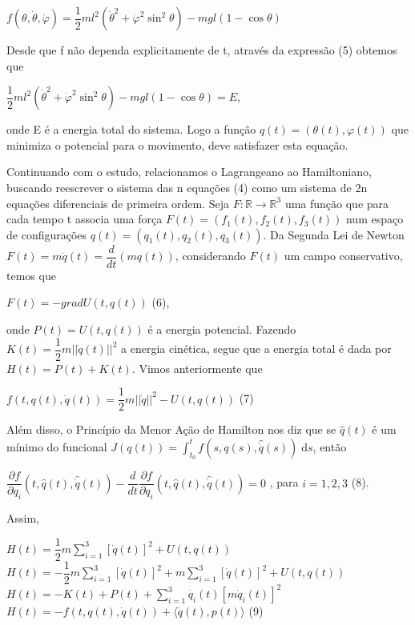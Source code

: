 \documentclass[12pt, a4paper]{article}
\begin{document}
\begin{center}
$ f(\theta, \dot \theta, \dot \varphi) =  \dfrac{1}{2}ml^2({\dot \theta}^2 + {\dot \varphi}^2 \sin^2 \theta) - mgl(1-\cos\theta)$
\end{center}

Desde que f não dependa explicitamente de t, através da expressão (5) obtemos que

\begin{center}
$\dfrac{1}{2}ml^2({\dot \theta}^2 + {\dot \varphi}^2 \sin^2 \theta) - mgl(1-\cos\theta) = E$,
\end{center}

onde E é a energia total do sistema. Logo a função $q(t)=(\theta(t),\varphi(t))$ que minimiza o potencial para o movimento, deve satisfazer esta equação.

Continuando com o estudo, relacionamos o Lagrangeano ao Hamiltoniano, buscando reescrever o sistema das n equações (4) como um sistema de 2n equações diferenciais de primeira ordem.
Seja $F: \mathbb{R} \to \mathbb{R}^3$ uma função que para cada tempo t associa uma força $F(t)=(f_1(t),f_2(t),f_3(t))$ num espaço de configurações $q(t)=(q_1(t),q_2(t),q_3(t))$. Da Segunda Lei de Newton $F(t)=m\ddot q(t)=  \dfrac{d}{dt}(mq(t))$, considerando $F(t)$ um campo conservativo, temos que

\begin{center}
$ F(t) = -grad U(t, q(t)) $ (6),
\end{center}

onde $P(t) = U(t,q(t))$ é a energia potencial. Fazendo $K(t)= \dfrac{1}{2} m||\dot{q}(t)||^2$ a energia cinética, segue que a energia total é dada por $H(t)=P(t)+K(t)$.
Vimos anteriormente que 

\begin{center}
$ f(t, q(t), \dot{q}(t)) = \dfrac{1}{2} m||\dot{q}||^2 -U(t, q(t)) $ (7)
\end{center}

Além disso, o Princípio da Menor Ação de Hamilton nos diz que se $\hat{q}(t)$ é um mínimo do funcional $J(q(t))= \int_{t_0}^t f(s,q(s),\hat{\dot{q}}(s)) \; \mathrm{d}s$, então 

\begin{center}
$ \dfrac{\partial f}{\partial q_i}(t, \hat{q}(t), \hat{\dot{q}}(t)) - \dfrac{d}{dt} \dfrac{\partial f}{\partial q_i}(t, \hat{q}(t), \hat{\dot{q}}(t)) = 0$ , para $i = 1,2,3$ (8).
\end{center}

Assim, 
\begin{center}
$H(t) = \dfrac{1}{2} m \sum_{i=1}^{3} [\dot{q}(t)]^2 + U(t,q(t))$\\
$H(t) = -\dfrac{1}{2} m \sum_{i=1}^{3} [\dot{q}(t)]^2 + m \sum_{i=1}^{3} [\dot{q}(t)]^2 + U(t,q(t))$\\
$H(t) = -K(t) + P(t) + \sum_{i=1}^{3} \dot{q_i}(t)[m\dot{q}_i(t)]^2 $\\
$H(t) = -f(t, q(t), \dot{q}(t)) + \langle \dot{q}(t), p(t) \rangle$ (9)
\end{center}
\end{document}
